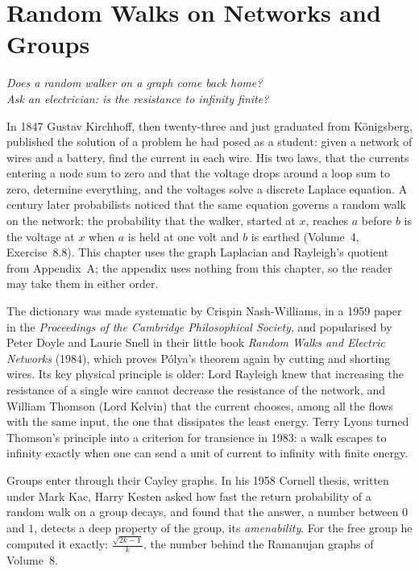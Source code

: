 \chapter{Random Walks on Networks and Groups}

\begin{center}\itshape
Does a random walker on a graph come back home?\\
Ask an electrician: is the resistance to infinity finite?
\end{center}

In 1847 Gustav Kirchhoff, then twenty-three and just graduated from K\"onigsberg, published the solution of a problem he had posed as a student: given a network of wires and a battery, find the
current in each wire. His two laws, that the currents entering a node sum to zero and that the voltage drops around a loop sum to zero, determine everything, and the voltages solve a discrete Laplace
equation. A century later probabilists noticed that the same equation governs a random walk on the network: the probability that the walker, started at $x$, reaches $a$ before $b$ is the voltage at $x$ when
$a$ is held at one volt and $b$ is earthed (Volume~4, Exercise~8.8). This chapter uses the graph Laplacian and Rayleigh's quotient from Appendix~A; the appendix uses nothing from this chapter, so the reader may take them in either order.

The dictionary was made systematic by Crispin Nash-Williams, in a 1959 paper in the \emph{Proceedings of the Cambridge Philosophical Society}, and popularised by Peter Doyle and Laurie Snell in their little
book \emph{Random Walks and Electric Networks} (1984), which proves P\'olya's theorem again by cutting and shorting wires. Its key physical principle is
older: Lord Rayleigh knew that increasing the resistance of a single wire cannot decrease the resistance of the network, and William Thomson (Lord Kelvin) that the current chooses, among all the flows with
the same input, the one that dissipates the least energy. Terry Lyons turned Thomson's principle into a criterion for transience in 1983: a walk escapes to infinity exactly when one can send a unit of
current to infinity with finite energy.

Groups enter through their Cayley graphs. In his 1958 Cornell thesis, written under Mark Kac, Harry Kesten asked how fast the return probability of a random walk on a group decays, and found that the
answer, a number between $0$ and $1$, detects a deep property of the group, its \emph{amenability}. For the free group he computed it exactly: $\frac{\sqrt{2k-1}}k$, the number behind the Ramanujan graphs of Volume~8.

